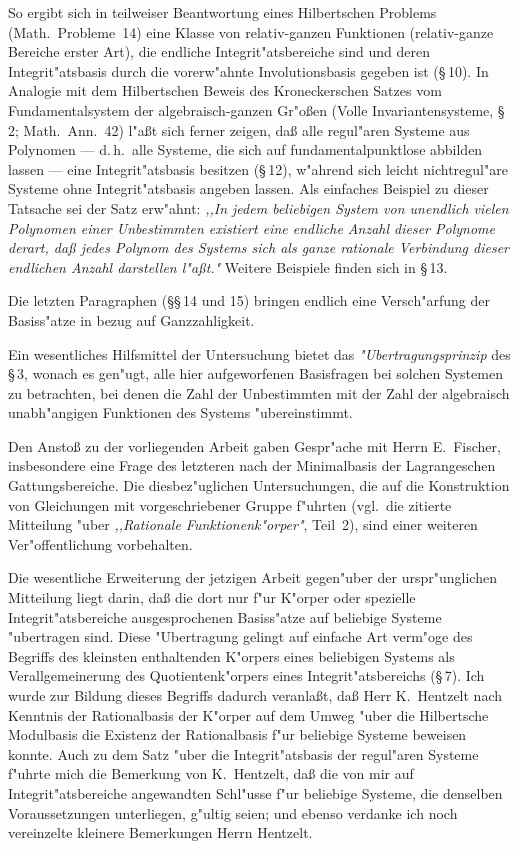 \documentclass[11pt,a4paper]{article}
\begin{document}
So ergibt sich in teilweiser Beantwortung eines Hilbertschen Problems
(Math.\ Probleme~14) eine Klasse von relativ-ganzen Funktionen (relativ-ganze
Bereiche erster Art), die endliche Integrit"{a}tsbereiche sind und deren
Integrit"{a}tsbasis durch die vorerw"{a}hnte Involutionsbasis gegeben ist (\S\,10).
In Analogie mit dem Hilbertschen Beweis des Kroneckerschen Satzes vom
Fundamentalsystem der algebraisch-ganzen Gr"{o}\ss{}en (Volle Invariantensysteme,
\S\,2; Math.\ Ann.\ 42) l"{a}\ss{}t sich ferner zeigen, da\ss{} alle regul"{a}ren
Systeme aus Polynomen --- d.\,h.\ alle Systeme, die sich auf fundamentalpunktlose
abbilden lassen --- eine Integrit"{a}tsbasis besitzen (\S\,12), w"{a}hrend
sich leicht nichtregul"{a}re Systeme ohne Integrit"{a}tsbasis angeben lassen.
Als einfaches Beispiel zu dieser Tatsache sei der Satz erw"{a}hnt: \emph{,,In jedem
beliebigen System von unendlich vielen Polynomen einer Unbestimmten
existiert eine endliche Anzahl dieser Polynome derart, da\ss{} jedes Polynom
des Systems sich als ganze rationale Verbindung dieser endlichen Anzahl
darstellen l"{a}\ss{}t."{}} Weitere Beispiele finden sich in \S\,13.

Die letzten Paragraphen (\S\S\,14 und 15) bringen endlich eine Versch"{a}rfung
der Basiss"{a}tze in bezug auf Ganzzahligkeit.

Ein wesentliches Hilfsmittel der Untersuchung bietet das \emph{"{U}bertragungsprinzip}
des \S\,3, wonach es gen"{u}gt, alle hier aufgeworfenen Basisfragen bei
solchen Systemen zu betrachten, bei denen die Zahl der Unbestimmten mit der
Zahl der algebraisch unabh"{a}ngigen Funktionen des Systems "{u}bereinstimmt.

Den Ansto\ss{} zu der vorliegenden Arbeit gaben Gespr"{a}che mit Herrn
E.~Fischer, insbesondere eine Frage des letzteren nach der Minimalbasis
der Lagrangeschen Gattungsbereiche. Die diesbez"{u}glichen Untersuchungen,
die auf die Konstruktion von Gleichungen mit vorgeschriebener Gruppe f"{u}hrten
(vgl.\ die zitierte Mitteilung "{u}ber \emph{,,Rationale Funktionenk"{o}rper"{}}, Teil~2),
sind einer weiteren Ver"{o}ffentlichung vorbehalten.

Die wesentliche Erweiterung der jetzigen Arbeit gegen"{u}ber der urspr"{u}nglichen
Mitteilung liegt darin, da\ss{} die dort nur f"{u}r K"{o}rper oder
spezielle Integrit"{a}tsbereiche ausgesprochenen Basiss"{a}tze auf beliebige Systeme
"{u}bertragen sind. Diese "{U}bertragung gelingt auf einfache Art verm"{o}ge des
Begriffs des kleinsten enthaltenden K"{o}rpers eines beliebigen Systems als
Verallgemeinerung des Quotientenk"{o}rpers eines Integrit"{a}tsbereichs (\S\,7).
Ich wurde zur Bildung dieses Begriffs dadurch veranla\ss{}t, da\ss{} Herr
K.~Hentzelt nach Kenntnis der Rationalbasis der K"{o}rper auf dem Umweg
"{u}ber die Hilbertsche Modulbasis die Existenz der Rationalbasis f"{u}r
beliebige Systeme beweisen konnte. Auch zu dem Satz "{u}ber die Integrit"{a}tsbasis
der regul"{a}ren Systeme f"{u}hrte mich die Bemerkung von K.~Hentzelt,
da\ss{} die von mir auf Integrit"{a}tsbereiche angewandten Schl"{u}sse f"{u}r
beliebige Systeme, die denselben Voraussetzungen unterliegen, g"{u}ltig seien;
und ebenso verdanke ich noch vereinzelte kleinere Bemerkungen Herrn Hentzelt.
\end{document}
